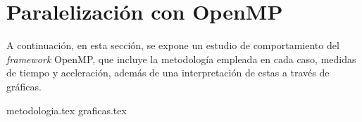 \section{Paralelización con OpenMP}

A continuación, en esta sección, se expone un estudio de comportamiento del \textit{framework} OpenMP, que incluye la metodología empleada en cada caso, medidas de tiempo y aceleración, además de una interpretación de estas a través de gráficas. 

{metodologia.tex}
\newpage
{graficas.tex}
